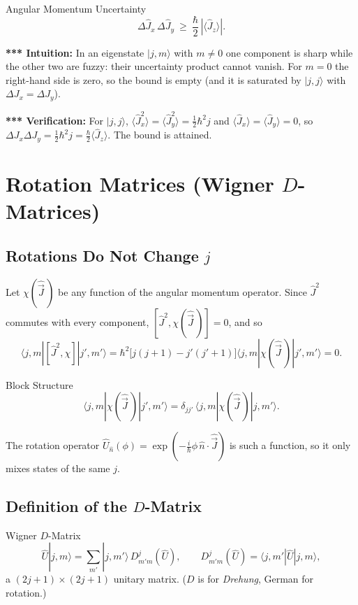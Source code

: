 \documentclass[11pt,a4paper]{article}
\begin{document}
\begin{thm}{Angular Momentum Uncertainty}
\[
\Delta\hat J_x\,\Delta\hat J_y\ \ge\ \frac\hbar2\,|\langle\hat J_z\rangle| .
\]
\end{thm}

\textbf{*** Intuition:} In an eigenstate $|j,m\rangle$ with $m\neq0$ one component is sharp while the other two are fuzzy: their uncertainty product cannot vanish. For $m=0$ the right-hand side is zero, so the bound is empty (and it is saturated by $|j,j\rangle$ with $\Delta J_x=\Delta J_y$).

\textbf{*** Verification:} For $|j,j\rangle$, $\langle\hat J_x^2\rangle=\langle\hat J_y^2\rangle=\tfrac12\hbar^2 j$ and $\langle\hat J_x\rangle=\langle\hat J_y\rangle=0$, so $\Delta J_x\Delta J_y=\tfrac12\hbar^2j=\tfrac\hbar2\langle\hat J_z\rangle$. The bound is attained.

\section{Rotation Matrices (Wigner \texorpdfstring{$D$}{D}-Matrices)}
\label{sy:sec:wigner}

\subsection{Rotations Do Not Change \texorpdfstring{$j$}{j}}
Let $\chi(\hat{\vec J}\,)$ be any function of the angular momentum operator. Since $\hat J^2$ commutes with every component, $[\hat J^2,\chi(\hat{\vec J}\,)]=0$, and so
\[
\langle j,m|[\hat J^2,\chi]|j',m'\rangle=\hbar^2\big[j(j+1)-j'(j'+1)\big]\langle j,m|\chi(\hat{\vec J}\,)|j',m'\rangle=0 .
\]
\begin{thm}{Block Structure}
\[
\langle j,m|\chi(\hat{\vec J}\,)|j',m'\rangle=\delta_{jj'}\,\langle j,m|\chi(\hat{\vec J}\,)|j,m'\rangle .
\]
\end{thm}
The rotation operator $\hat U_{\hat n}(\phi)=\exp(-\tfrac i\hbar\phi\,\hat n\cdot\hat{\vec J})$ is such a function, so it only mixes states of the same $j$.

\subsection{Definition of the \texorpdfstring{$D$}{D}-Matrix}
\begin{thm}{Wigner $D$-Matrix}
\[
\hat U|j,m\rangle=\sum_{m'}|j,m'\rangle\,D^j_{m'm}(\hat U),\qquad D^j_{m'm}(\hat U)=\langle j,m'|\hat U|j,m\rangle ,
\]
a $(2j+1)\times(2j+1)$ unitary matrix. ($D$ is for \emph{Drehung}, German for rotation.)
\end{thm}
\end{document}
